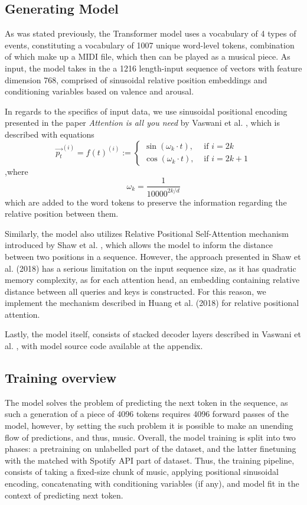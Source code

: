 \documentclass[14pt]{extreport}
\begin{document}
\subsection{Generating Model}
As was stated previously, the Transformer model uses a vocabulary of 4 types of events, constituting a vocabulary of 1007 unique word-level tokens, combination of which make up a MIDI file, which then can be played as a musical piece. As input, the model takes in the a 1216 length-input sequence of vectors with feature dimension 768, comprised of sinusoidal relative position embeddings and conditioning variables based on \gls{valence} and \gls{arousal}. 


In regards to the specifics of input data, we use sinusoidal positional encoding presented in the paper \emph{Attention is all you need} by Vaswani et al. \cite{attention}, which is described with equations 
$$
{\overrightarrow{p_t}}^{(i)}=f(t)^{(i)}:= \begin{cases}\sin \left(\omega_k \cdot t\right), & \text { if } i=2 k \\ \cos \left(\omega_k \cdot t\right), & \text { if } i=2 k+1\end{cases}
$$
,where 
$$
\omega_k=\frac{1}{10000^{2 k / d}}
$$
which are added to the word tokens to preserve the information regarding the relative position between them.

Similarly, the model also utilizes Relative Positional Self-Attention mechanism introduced by Shaw et al. \cite{shaw}, which allows the model to inform the distance between two positions in a sequence. However, the approach presented in Shaw et al. (2018) \cite{shaw} has a serious limitation on the input sequence size, as it has quadratic memory complexity, as for each attention head, an embedding containing relative distance between all queries and keys is constructed. For this reason, we implement the mechanism described in Huang et al. (2018) \cite{huang} for relative positional attention.

Lastly, the model itself, consists of stacked decoder layers described in Vaswani et al. \cite{attention}, with model source code available at the appendix.

\subsection{Training overview}
The model solves the problem of predicting the next token in the sequence, as such a generation of a piece of 4096 tokens requires 4096 forward passes of the model, however, by setting the such problem it is possible to make an unending flow of predictions, and thus, music. Overall, the model training is split into two phases: a pretraining on unlabelled part of the dataset, and the latter finetuning with the matched with Spotify API part of dataset. Thus, the training pipeline, consists of taking a fixed-size chunk of music, applying positional sinusoidal encoding, concatenating with conditioning variables (if any), and model fit in the context of predicting next token.  
\end{document}
